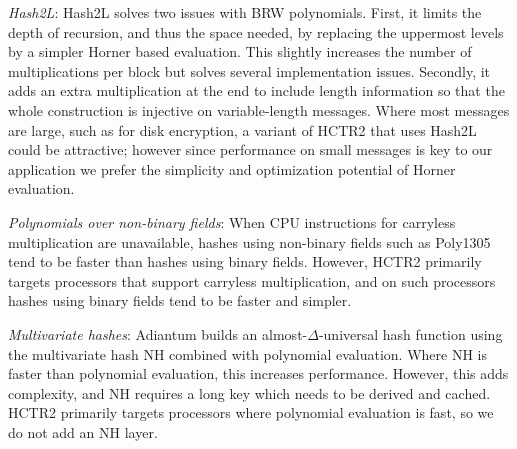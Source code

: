 \documentclass[hctr2.tex]{subfiles}
\begin{document}
\emph{Hash2L}: Hash2L\cite{hash2l} solves two issues with BRW polynomials.
First, it limits the depth of recursion, and thus the space needed, by replacing
the uppermost levels by a simpler Horner based evaluation. This slightly increases
the number of multiplications per block but solves several implementation issues.
Secondly, it adds an extra multiplication at the end to include length information
so that the whole construction is injective on variable-length messages.
Where most messages are large, such as for disk encryption, a variant of
HCTR2 that uses Hash2L could be attractive; however since performance
on small messages is key to our application we prefer the simplicity
and optimization potential of Horner evaluation.

\emph{Polynomials over non-binary fields}: When CPU instructions for carryless
multiplication are unavailable, hashes using non-binary fields such as
Poly1305\cite{poly1305} tend to be faster than hashes using binary fields.
However, HCTR2 primarily targets
processors that support carryless multiplication, 
and on such processors hashes
using binary fields tend to be faster and simpler.

\emph{Multivariate hashes}: Adiantum\cite{adiantum} builds an
almost-$\Delta$-universal hash function using the multivariate hash
NH\cite{umac1} combined with polynomial evaluation. Where NH is faster than
polynomial evaluation, this increases performance. However, this adds
complexity, and NH requires a long key which needs to be derived and cached. 
HCTR2 primarily targets processors where polynomial evaluation is fast, so
we do not add an NH layer.
\end{document}
